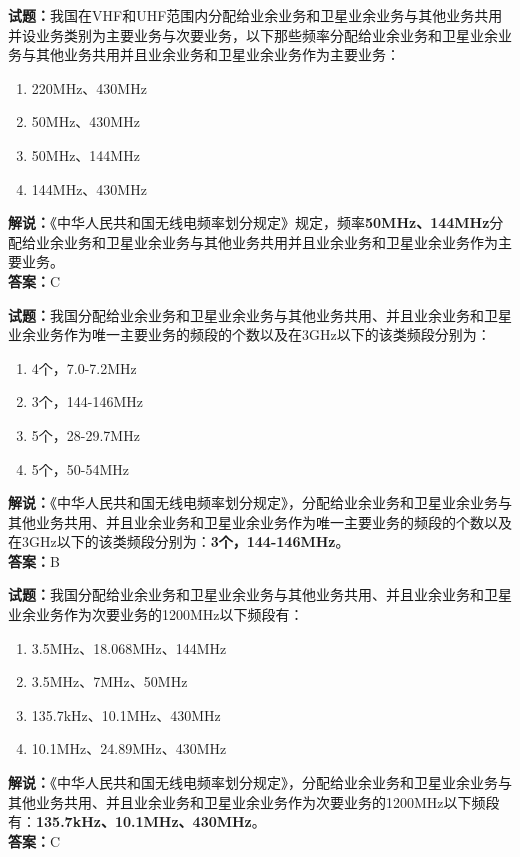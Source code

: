 \documentclass{ctexbook}
\begin{document}
\noindent\textbf{试题：}我国在VHF和UHF范围内分配给业余业务和卫星业余业务与其他业务共用并设业务类别为主要业务与次要业务，以下那些频率分配给业余业务和卫星业余业务与其他业务共用并且业余业务和卫星业余业务作为主要业务：
\begin{enumerate}[leftmargin=3em]
	\item 220\si{\MHz}、430\si{\MHz}
	\item 50\si{\MHz}、430\si{\MHz}
	\item 50\si{\MHz}、144\si{\MHz}
	\item 144\si{\MHz}、430\si{\MHz}
\end{enumerate}
\noindent\textbf{解说：}《中华人民共和国无线电频率划分规定》规定，频率\textbf{50\si{\MHz}、144\si{\MHz}}分配给业余业务和卫星业余业务与其他业务共用并且业余业务和卫星业余业务作为主要业务。\\\noindent\textbf{答案：}C


\bigskip


\noindent\textbf{试题：}我国分配给业余业务和卫星业余业务与其他业务共用、并且业余业务和卫星业余业务作为唯一主要业务的频段的个数以及在3\si{\GHz}以下的该类频段分别为：
\begin{enumerate}[leftmargin=3em]
	\item 4个，7.0-7.2\si{\MHz}
	\item 3个，144-146\si{\MHz}
	\item 5个，28-29.7\si{\MHz}
	\item 5个，50-54\si{\MHz}
\end{enumerate}
\noindent\textbf{解说：}《中华人民共和国无线电频率划分规定》，分配给业余业务和卫星业余业务与其他业务共用、并且业余业务和卫星业余业务作为唯一主要业务的频段的个数以及在3\si{\GHz}以下的该类频段分别为：\textbf{3个，144-146\si{\MHz}}。\\\noindent\textbf{答案：}B


\bigskip


\noindent\textbf{试题：}我国分配给业余业务和卫星业余业务与其他业务共用、并且业余业务和卫星业余业务作为次要业务的1200\si{\MHz}以下频段有：
\begin{enumerate}[leftmargin=3em]
	\item 3.5\si{\MHz}、18.068\si{\MHz}、144\si{\MHz}
	\item 3.5\si{\MHz}、7\si{\MHz}、50\si{\MHz}
	\item 135.7\si{\kHz}、10.1\si{\MHz}、430\si{\MHz}
	\item 10.1\si{\MHz}、24.89\si{\MHz}、430\si{\MHz}
\end{enumerate}
\noindent\textbf{解说：}《中华人民共和国无线电频率划分规定》，分配给业余业务和卫星业余业务与其他业务共用、并且业余业务和卫星业余业务作为次要业务的1200\si{\MHz}以下频段有：\textbf{135.7\si{\kHz}、10.1\si{\MHz}、430\si{\MHz}}。\\\noindent\textbf{答案：}C
\end{document}
